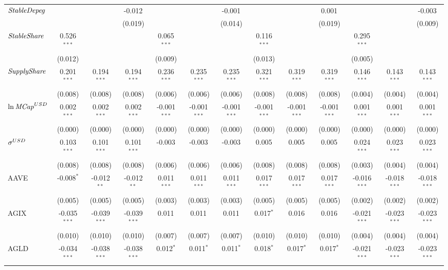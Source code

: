 \begin{table}[!htbp]
\begin{tabular}{@{\extracolsep{5pt}}lcccccccccccc}
 ${\it StableDepeg}$ & & & -0.012$^{}$ & & & -0.001$^{}$ & & & 0.001$^{}$ & & & -0.003$^{}$ \\
  & & & (0.019) & & & (0.014) & & & (0.019) & & & (0.009) \\
 ${\it StableShare}$ & 0.526$^{***}$ & & & 0.065$^{***}$ & & & 0.116$^{***}$ & & & 0.295$^{***}$ & & \\
  & (0.012) & & & (0.009) & & & (0.013) & & & (0.005) & & \\
 ${\it SupplyShare}$ & 0.201$^{***}$ & 0.194$^{***}$ & 0.194$^{***}$ & 0.236$^{***}$ & 0.235$^{***}$ & 0.235$^{***}$ & 0.321$^{***}$ & 0.319$^{***}$ & 0.319$^{***}$ & 0.146$^{***}$ & 0.143$^{***}$ & 0.143$^{***}$ \\
  & (0.008) & (0.008) & (0.008) & (0.006) & (0.006) & (0.006) & (0.008) & (0.008) & (0.008) & (0.004) & (0.004) & (0.004) \\
 ${\it \ln MCap}^{USD}$ & 0.002$^{***}$ & 0.002$^{***}$ & 0.002$^{***}$ & -0.001$^{***}$ & -0.001$^{***}$ & -0.001$^{***}$ & -0.001$^{***}$ & -0.001$^{***}$ & -0.001$^{***}$ & 0.001$^{***}$ & 0.001$^{***}$ & 0.001$^{***}$ \\
  & (0.000) & (0.000) & (0.000) & (0.000) & (0.000) & (0.000) & (0.000) & (0.000) & (0.000) & (0.000) & (0.000) & (0.000) \\
 ${\it \sigma}^{USD}$ & 0.103$^{***}$ & 0.101$^{***}$ & 0.101$^{***}$ & -0.003$^{}$ & -0.003$^{}$ & -0.003$^{}$ & 0.005$^{}$ & 0.005$^{}$ & 0.005$^{}$ & 0.024$^{***}$ & 0.023$^{***}$ & 0.023$^{***}$ \\
  & (0.008) & (0.008) & (0.008) & (0.006) & (0.006) & (0.006) & (0.008) & (0.008) & (0.008) & (0.003) & (0.004) & (0.004) \\
 AAVE & -0.008$^{*}$ & -0.012$^{**}$ & -0.012$^{**}$ & 0.011$^{***}$ & 0.011$^{***}$ & 0.011$^{***}$ & 0.017$^{***}$ & 0.017$^{***}$ & 0.017$^{***}$ & -0.016$^{***}$ & -0.018$^{***}$ & -0.018$^{***}$ \\
  & (0.005) & (0.005) & (0.005) & (0.003) & (0.003) & (0.003) & (0.005) & (0.005) & (0.005) & (0.002) & (0.002) & (0.002) \\
 AGIX & -0.035$^{***}$ & -0.039$^{***}$ & -0.039$^{***}$ & 0.011$^{}$ & 0.011$^{}$ & 0.011$^{}$ & 0.017$^{*}$ & 0.016$^{}$ & 0.016$^{}$ & -0.021$^{***}$ & -0.023$^{***}$ & -0.023$^{***}$ \\
  & (0.010) & (0.010) & (0.010) & (0.007) & (0.007) & (0.007) & (0.010) & (0.010) & (0.010) & (0.004) & (0.004) & (0.004) \\
 AGLD & -0.034$^{***}$ & -0.038$^{***}$ & -0.038$^{***}$ & 0.012$^{*}$ & 0.011$^{*}$ & 0.011$^{*}$ & 0.018$^{*}$ & 0.017$^{*}$ & 0.017$^{*}$ & -0.021$^{***}$ & -0.023$^{***}$ & -0.023$^{***}$ \\

\end{tabular}
\end{table}
